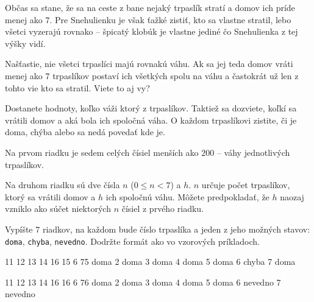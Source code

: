 




Občas sa stane, že sa na ceste z bane nejaký trpaslík stratí a domov ich príde menej ako $7$. Pre
Snehulienku je však ťažké zistiť, kto sa vlastne stratil, lebo všetci vyzerajú rovnako -- špicatý
klobúk je vlastne jediné čo Snehulienka z tej výšky vidí.

Našťastie, nie všetci trpaslíci majú rovnakú váhu. Ak sa jej teda domov vráti menej ako $7$
trpaslíkov postaví ich všetkých spolu na váhu a častokrát už len z tohto vie kto sa stratil. Viete
to aj vy?


Dostanete hodnoty, koľko váži ktorý z trpaslíkov. Taktiež sa dozviete, koľkí sa vrátili domov a aká
bola ich spoločná váha. O každom trpaslíkovi zistite, či je doma, chýba alebo sa nedá povedať kde
je.


Na prvom riadku je sedem celých čísiel menších ako $200$ -- váhy jednotlivých trpaslíkov.

Na druhom riadku sú dve čísla $n$ ($0 \leq n < 7$) a $h$. $n$ určuje počet trpaslíkov, ktorý sa
vrátili domov a $h$ ich spoločnú váhu. Môžete predpokladať, že $h$ naozaj vzniklo ako súčet
niektorých $n$ čísiel z prvého riadku.


Vypíšte $7$ riadkov, na každom bude číslo trpaslíka a jeden z jeho možných stavov: \texttt{doma},
\texttt{chyba}, \texttt{nevedno}. Dodržte formát ako vo vzorových príkladoch.


 11 12 13 14 16 15
6 75
 doma
2 doma
3 doma
4 doma
5 doma
6 chyba
7 doma
\koniec

 11 12 13 14 16 16
6 76
 doma
2 doma
3 doma
4 doma
5 doma
6 nevedno
7 nevedno
\koniec


